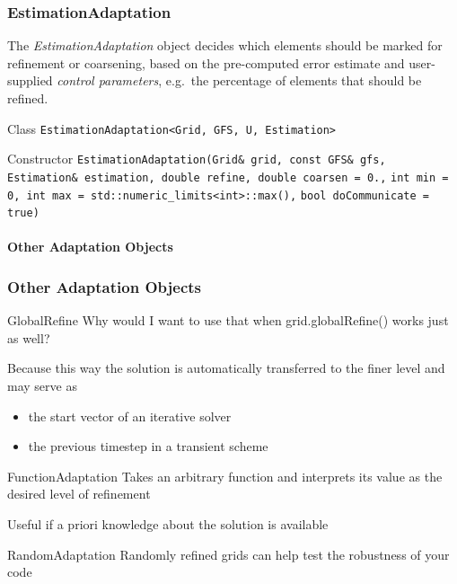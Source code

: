 \begin{frame}[fragile]
  \frametitle<presentation>{EstimationAdaptation}
  The \emph{EstimationAdaptation} object decides which elements should be marked for refinement or coarsening, based on the pre-computed error estimate and user-supplied \emph{control parameters}, e.g.~the percentage of elements that should be refined.

  \pause

  \begin{block}{Class}
    \lstinline{EstimationAdaptation<Grid, GFS, U, Estimation>}
  \end{block}

  \pause

  \begin{block}{Constructor}
    \lstinline{EstimationAdaptation(Grid& grid, const GFS& gfs,}
    \lstinline{Estimation& estimation, double refine, double coarsen = 0.,}
    \lstinline{int min = 0, int max = std::numeric_limits<int>::max(),}
    \lstinline{bool doCommunicate = true)}
  \end{block}
\end{frame}

\paragraph{Other Adaptation Objects}

\begin{frame}
  \frametitle<presentation>{Other Adaptation Objects}

  \begin{block}{GlobalRefine}
    Why would I want to use that when grid.globalRefine() works just as well?

    Because this way the solution is automatically transferred to the finer level and may serve as
    \begin{itemize}
      \item the start vector of an iterative solver
      \item the previous timestep in a transient scheme
    \end{itemize}
  \end{block}

  \begin{block}{FunctionAdaptation}
    Takes an arbitrary function and interprets its value as the desired level of refinement

    Useful if a priori knowledge about the solution is available
  \end{block}

  \begin{block}{RandomAdaptation}
    Randomly refined grids can help test the robustness of your code
  \end{block}
\end{frame}

